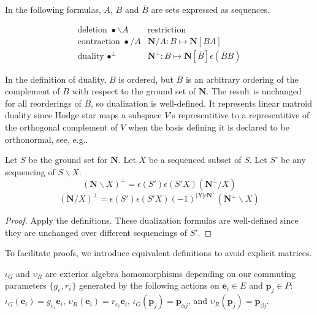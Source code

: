 \documentclass[Unicode]{cedram-alco}
\newcommand{\ext}[1]{\ensuremath{\mathbf{#1}}}
\newcommand{\Is}{\ensuremath{\iota}}
\newcommand{\Vs}{\ensuremath{\upsilon}}
\begin{document}
In the following formulas, $A$, $B$ and $\overline{B}$ are
sets expressed as sequences.
\begin{defi}\label{extmatdefs}
    \[
    \begin{array}{cc}
\text{deletion\ } \bullet\backslash A  & \text{restriction}  \\
\text{contraction\ }\bullet / A             & \ext{N}/A:B\mapsto\ext{N}[BA]\\
\text{duality\ }\bullet^{\perp} &
\ext{N}^{\perp}:B\mapsto\ext{N}[\overline{B}]\epsilon(\overline{B}B)
    \end{array}
    \]
\end{defi}
    In the definition of duality, $B$ is ordered,
    but $\overline{B}$ is an arbitrary ordering of the complement of $B$
    with respect to the ground set of $\ext{N}$.
    The result is unchanged for all reorderings of $\overline{B}$,
    so dualization is well-defined.  It represents linear matroid duality
    since Hodge star maps a subspace $V$'s representitive to a representitive
    of the orthogonal complement of $V$ when the basis defining it is
    declared to be orthonormal, see, e.g.\cite{MarcusFDMuAlPt2}.



\begin{prop}
  Let $S$ be the ground set for $\ext{N}$.
  Let $X$ be a sequenced subset of $S$.
  Let $S'$ be any sequencing of $S\backslash X$.
    \begin{equation} (\ext{N}\backslash X)^\perp = \epsilon(S')\epsilon(S'X)(\ext{N}^\perp/X)
    \end{equation}
    \begin{equation} (\ext{N}/X)^\perp = \epsilon(S')\epsilon(S'X)(-1)^{|X|r\ext{N}^\perp}(\ext{N}^\perp\backslash X)
    \end{equation}
\end{prop}
\begin{proof}
  Apply the definitions.  These dualization formulas are well-defined since they
  are unchanged over different sequencings of $S'$.
\end{proof}

To facilitate proofs, we introduce equivalent definitions to avoid explicit matrices.
\begin{defi}
  $\Is_G$ and $\Vs_R$ are exterior algebra homomorphisms depending on our commuting parameters
  $\{g_e, r_e\}$ generated by
  the following actions on $\ext{e}_i\in E$ and $\ext{p}_j\in P$:
  $\Is_G(\ext{e}_i)= g_{e_i}\ext{e}_i$, $\Vs_R(\ext{e}_i)=r_{e_i}\ext{e}_i$,
  $\Is_G(\ext{p}_j)=\ext{p}_{\alpha j}$, and   $\Vs_R(\ext{p}_j)=\ext{p}_{\beta j}$.
\end{defi}
\end{document}
